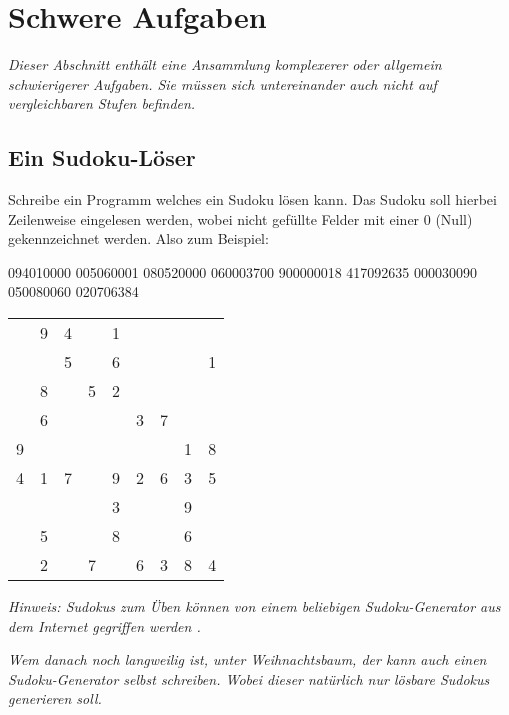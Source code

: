 \documentclass[table]{sopra-base}
\begin{document}
%
%
%
%

\section{Schwere Aufgaben}

\textit{Dieser Abschnitt enthält eine Ansammlung komplexerer oder allgemein schwierigerer Aufgaben. Sie müssen sich untereinander auch nicht auf vergleichbaren Stufen befinden.}

\subsection{Ein Sudoku-Löser}

Schreibe ein Programm welches ein Sudoku lösen kann. Das Sudoku soll hierbei Zeilenweise eingelesen werden, wobei nicht gefüllte Felder mit
einer $0$ (Null) gekennzeichnet werden. Also zum Beispiel:\smallskip\newline
\begin{minipage}{0.5\linewidth}
\begin{void}
094010000
005060001
080520000
060003700
900000018
417092635
000030090
050080060
020706384
\end{void}
\end{minipage}\begin{minipage}{0.5\linewidth}
\centering \begin{tabular}{ccc|ccc|ccc}
&9&4&&1&&&&\\
&&5&&6&&&&1\\
&8&&5&2&&&&\\\hline
&6&&&&3&7&&\\
9&&&&&&&1&8\\
4&1&7&&9&2&6&3&5\\\hline
&&&&3&&&9&\\
&5&&&8&&&6&\\
&2&&7&&6&3&8&4\\
\end{tabular}
\end{minipage}\par
\textit{Hinweis: Sudokus zum Üben können von einem beliebigen Sudoku-Generator aus dem Internet gegriffen werden \Smiley.}\par{}
\textit{Wem danach noch langweilig ist, unter Weihnachtsbaum, der kann auch einen Sudoku-Generator selbst schreiben. Wobei dieser natürlich nur lösbare Sudokus generieren soll.}\par{}
\end{document}
